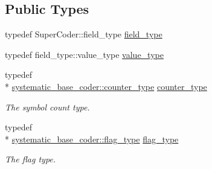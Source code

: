 \subsection*{Public Types}
\begin{DoxyCompactItemize}
\item 
typedef Super\-Coder\-::field\-\_\-type \hyperlink{classkodo_1_1systematic__decoder_a1852a220ecbed3f15a42741e895ee3f7}{field\-\_\-type}
\begin{DoxyCompactList}\small\item\em \end{DoxyCompactList}\item 
typedef field\-\_\-type\-::value\-\_\-type \hyperlink{classkodo_1_1systematic__decoder_ae2ade6d73c4899ac753db062de3d52bb}{value\-\_\-type}
\begin{DoxyCompactList}\small\item\em \end{DoxyCompactList}\item 
\hypertarget{classkodo_1_1systematic__decoder_a3646afc445e14bb14b51c9344a6abf51}{typedef \\*
\hyperlink{classkodo_1_1systematic__base__coder_ae380cbb615817050943c82186714025c}{systematic\-\_\-base\-\_\-coder\-::counter\-\_\-type} \hyperlink{classkodo_1_1systematic__decoder_a3646afc445e14bb14b51c9344a6abf51}{counter\-\_\-type}}\label{classkodo_1_1systematic__decoder_a3646afc445e14bb14b51c9344a6abf51}

\begin{DoxyCompactList}\small\item\em The symbol count type. \end{DoxyCompactList}\item 
\hypertarget{classkodo_1_1systematic__decoder_a49a09149f3a2afad15854c6fc1cec5a0}{typedef \\*
\hyperlink{classkodo_1_1systematic__base__coder_a5bf58be17746f35c5533306610a20181}{systematic\-\_\-base\-\_\-coder\-::flag\-\_\-type} \hyperlink{classkodo_1_1systematic__decoder_a49a09149f3a2afad15854c6fc1cec5a0}{flag\-\_\-type}}\label{classkodo_1_1systematic__decoder_a49a09149f3a2afad15854c6fc1cec5a0}

\begin{DoxyCompactList}\small\item\em The flag type. \end{DoxyCompactList}\end{DoxyCompactItemize}
